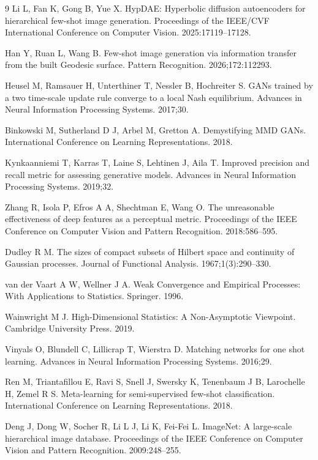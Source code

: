 \documentclass[preprint,12pt,number]{elsarticle}
\begin{document}
\begin{thebibliography}{9}
Li L, Fan K, Gong B, Yue X. HypDAE: Hyperbolic diffusion autoencoders for hierarchical few-shot image generation. Proceedings of the IEEE/CVF International Conference on Computer Vision. 2025:17119--17128.

Han Y, Ruan L, Wang B. Few-shot image generation via information transfer from the built Geodesic surface. Pattern Recognition. 2026;172:112293.

Heusel M, Ramsauer H, Unterthiner T, Nessler B, Hochreiter S. GANs trained by a two time-scale update rule converge to a local Nash equilibrium. Advances in Neural Information Processing Systems. 2017;30.

Binkowski M, Sutherland D J, Arbel M, Gretton A. Demystifying MMD GANs. International Conference on Learning Representations. 2018.

Kynkaanniemi T, Karras T, Laine S, Lehtinen J, Aila T. Improved precision and recall metric for assessing generative models. Advances in Neural Information Processing Systems. 2019;32.

Zhang R, Isola P, Efros A A, Shechtman E, Wang O. The unreasonable effectiveness of deep features as a perceptual metric. Proceedings of the IEEE Conference on Computer Vision and Pattern Recognition. 2018:586--595.

Dudley R M. The sizes of compact subsets of Hilbert space and continuity of Gaussian processes. Journal of Functional Analysis. 1967;1(3):290--330.

van der Vaart A W, Wellner J A. Weak Convergence and Empirical Processes: With Applications to Statistics. Springer. 1996.

Wainwright M J. High-Dimensional Statistics: A Non-Asymptotic Viewpoint. Cambridge University Press. 2019.

Vinyals O, Blundell C, Lillicrap T, Wierstra D. Matching networks for one shot learning. Advances in Neural Information Processing Systems. 2016;29.

Ren M, Triantafillou E, Ravi S, Snell J, Swersky K, Tenenbaum J B, Larochelle H, Zemel R S. Meta-learning for semi-supervised few-shot classification. International Conference on Learning Representations. 2018.

Deng J, Dong W, Socher R, Li L J, Li K, Fei-Fei L. ImageNet: A large-scale hierarchical image database. Proceedings of the IEEE Conference on Computer Vision and Pattern Recognition. 2009:248--255.


\end{thebibliography}
\end{document}
